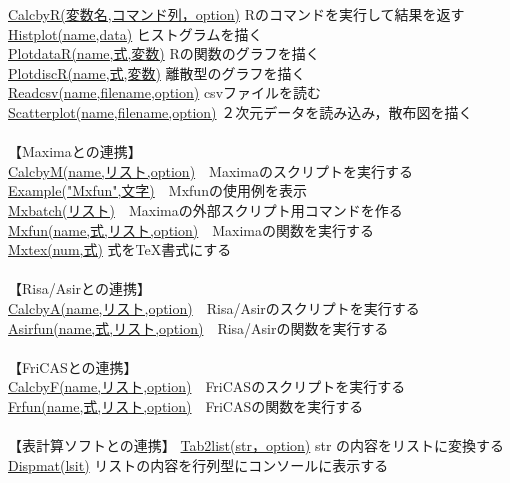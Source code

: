 \documentclass[papersize,a4paper,12pt,uplatex]{jsarticle}
\begin{document}
\begin{tabbing}
\hyperlink{calcbyr}{CalcbyR(変数名,コマンド列，option)}  \>Rのコマンドを実行して結果を返す\\
\hyperlink{histplot}{Histplot(name,data)}  \>ヒストグラムを描く\\
\hyperlink{plotdatar}{PlotdataR(name,式,変数)}  \>Rの関数のグラフを描く\\
\hyperlink{plotdiscr}{PlotdiscR(name,式,変数)}  \>離散型のグラフを描く\\
\hyperlink{readcsv}{Readcsv(name,filename,option)}  \>csvファイルを読む\\
\hyperlink{scatterplot}{Scatterplot(name,filename,option)}  \>２次元データを読み込み，散布図を描く\\
　\\
【Maximaとの連携】\\
\hyperlink{calcbyM}{CalcbyM(name,リスト,option)}　\>Maximaのスクリプトを実行する\\
\hyperlink{example}{Example("Mxfun",文字)}　\>Mxfunの使用例を表示\\
\hyperlink{mxbatch}{Mxbatch(リスト)}　\>Maximaの外部スクリプト用コマンドを作る\\
\hyperlink{mxfun}{Mxfun(name,式,リスト,option)}　\>Maximaの関数を実行する\\
\hyperlink{mxtex}{Mxtex(num,式)}  \>式をTeX書式にする\\
　\\
【Risa/Asirとの連携】\\
\hyperlink{calcbyA}{CalcbyA(name,リスト,option)}　\>Risa/Asirのスクリプトを実行する\\
\hyperlink{asirfun}{Asirfun(name,式,リスト,option)}　\>Risa/Asirの関数を実行する\\
　\\
【FriCASとの連携】\\
\hyperlink{calcbyF}{CalcbyF(name,リスト,option)}　\>FriCASのスクリプトを実行する\\
\hyperlink{frfun}{Frfun(name,式,リスト,option)}　\>FriCASの関数を実行する\\
　\\
【表計算ソフトとの連携】
\hyperlink{tab2list}{Tab2list(str，option)}  \>str の内容をリストに変換する\\
\hyperlink{Dispmat}{Dispmat(lsit)}  \>リストの内容を行列型にコンソールに表示する\\

\hypertarget{functionlist3d}{}


\end{tabbing}
\end{document}
